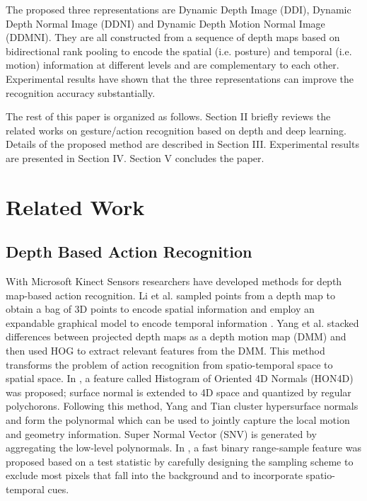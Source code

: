 \documentclass[10pt, a4paper, conference]{IEEEtran}
\begin{document}

The proposed three representations are Dynamic Depth Image (DDI), Dynamic Depth Normal Image (DDNI) and Dynamic Depth Motion Normal Image (DDMNI). They are all constructed from a sequence of depth maps based on bidirectional rank pooling to encode the spatial (i.e. posture) and temporal (i.e. motion) information at different levels and are complementary to each other. Experimental results have shown that the three representations can improve the recognition accuracy substantially. 

The rest of this paper is organized as follows. Section II briefly reviews the related works on gesture/action recognition based on depth and deep learning. Details of the proposed method are described in Section III. Experimental results are presented in Section IV. Section V concludes the paper.

\section{Related Work}
\subsection{Depth Based Action Recognition}
With Microsoft Kinect Sensors researchers have developed methods for depth map-based action recognition. Li et al. \cite{li2010action} sampled points 
from a depth map to obtain a bag of 3D points to encode spatial information and 
employ an expandable graphical model to encode temporal information 
\cite{li2008}. Yang et al. \cite{Yang2012a} stacked differences between projected depth maps as 
a depth motion map (DMM) and then used HOG to extract relevant features from the 
DMM. This method transforms the problem of action recognition from 
spatio-temporal space to spatial space.  In \cite{Oreifej2013}, a feature called Histogram of Oriented 4D 
Normals (HON4D) was proposed; surface normal is extended to 4D space and 
quantized by regular polychorons. Following this method, Yang and Tian 
\cite{yangsuper} cluster hypersurface normals and form the polynormal which can 
be used to jointly capture the local motion and geometry information. Super 
Normal Vector (SNV) is generated by aggregating the low-level polynormals. In 
\cite{lurange}, a fast binary range-sample feature was proposed based on a test 
statistic by carefully designing the sampling scheme to exclude most pixels that 
fall into the background and to incorporate spatio-temporal cues. 
\end{document}
